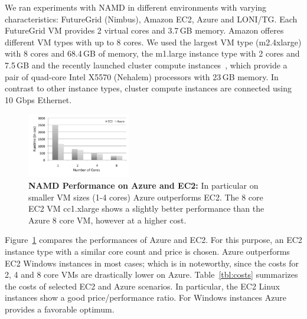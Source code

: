\documentclass[conference,final]{IEEEtran}
\newcommand{\up}{\vspace*{-1em}}
\begin{document}

We ran experiments with NAMD in different environments with varying
characteristics: FutureGrid (Nimbus), Amazon EC2, Azure and
LONI/TG.  Each FutureGrid VM provides 2 virtual cores and
3.7\,GB memory.  Amazon offeres different VM types with up to 8
cores. We used the largest VM type (m2.4xlarge) with 8 cores and
68.4\,GB of memory, the m1.large instance type with 2 cores and
7.5\,GB and the recently launched cluster compute
instances~\cite{ec2-cc}, which provide a pair of quad-core Intel X5570
(Nehalem) processors with 23\,GB memory. In contrast to other instance
types, cluster compute instances are connected using 10 Gbps Ethernet.


\begin{figure}[t]
    \centering
        \includegraphics[width=0.4\textwidth]{performance/namd_ec2_azure.pdf}
        \up
        \caption{\textbf{NAMD Performance on Azure and EC2:} In
          particular on smaller VM sizes (1-4 cores) Azure outperforms
          EC2. The 8 core EC2 VM cc1.xlarge shows a slightly better
          performance than the Azure 8 core VM, however at a higher
          cost.} %
    \label{fig:performance_namd_ec2_azure}
    \up\up
\end{figure}

Figure~\ref{fig:performance_namd_ec2_azure} compares the performances
of Azure and EC2. For this purpose, an EC2 instance type with a similar core
count and price is chosen. Azure outperforms EC2 Windows instances in 
most cases; which is in noteworthy, since the costs for 2, 4 and 8 core VMs are
drastically lower on Azure. Table~\ref{tbl:costs} summarizes the
costs of selected EC2 and Azure scenarios. In particular, the EC2
Linux instances show a good price/performance ratio. For Windows
instances Azure provides a favorable optimum.


\end{document}
